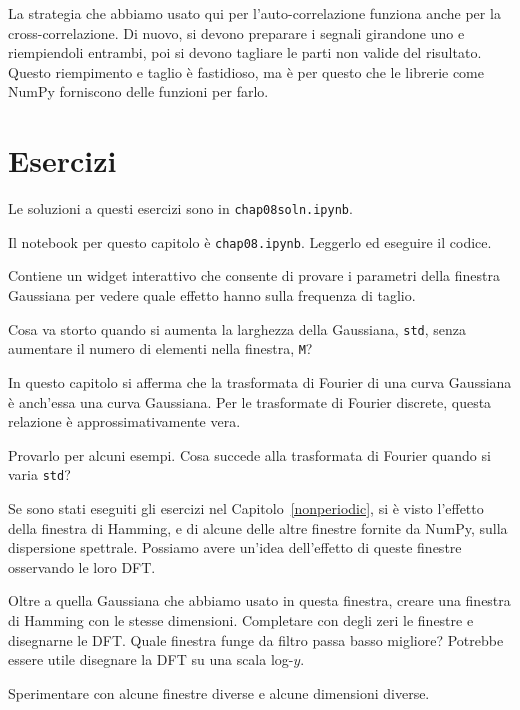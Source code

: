 \documentclass[12pt,a4paper]{book}
\begin{document}
La strategia che abbiamo usato qui per l'auto-correlazione funziona anche per la cross-correlazione. Di nuovo, si devono preparare i segnali girandone uno e riempiendoli entrambi, poi si devono tagliare le parti non valide del risultato. Questo riempimento e taglio è fastidioso, ma è per questo che le librerie come NumPy forniscono delle funzioni per farlo.

\section{Esercizi} 

Le soluzioni a questi esercizi sono in {\tt chap08soln.ipynb}.

\begin{exercise} Il notebook per questo capitolo è {\tt chap08.ipynb}. Leggerlo ed eseguire il codice.

Contiene un widget interattivo che consente di provare i parametri della finestra Gaussiana per vedere quale effetto hanno sulla frequenza di taglio.

Cosa va storto quando si aumenta la larghezza della Gaussiana, {\tt std}, senza aumentare il numero di elementi nella finestra, {\tt M}? \end{exercise} 

\begin{exercise} In questo capitolo si afferma che la trasformata di Fourier di una curva Gaussiana è anch'essa una curva Gaussiana. Per le trasformate di Fourier discrete, questa relazione è approssimativamente vera.

Provarlo per alcuni esempi. Cosa succede alla trasformata di Fourier quando si varia {\tt std}? \end{exercise} 

\begin{exercise} Se sono stati eseguiti gli esercizi nel Capitolo~\ref{nonperiodic}, si è visto l'effetto della finestra di Hamming, e di alcune delle altre finestre fornite da NumPy, sulla dispersione spettrale. Possiamo avere un'idea dell'effetto di queste finestre osservando le loro DFT.

Oltre a quella Gaussiana che abbiamo usato in questa finestra, creare una finestra di Hamming con le stesse dimensioni. Completare con degli zeri le finestre e disegnarne le DFT. Quale finestra funge da filtro passa basso migliore? Potrebbe essere utile disegnare la DFT su una scala log-$y$.

Sperimentare con alcune finestre diverse e alcune dimensioni diverse. \end{exercise} 
\end{document}
